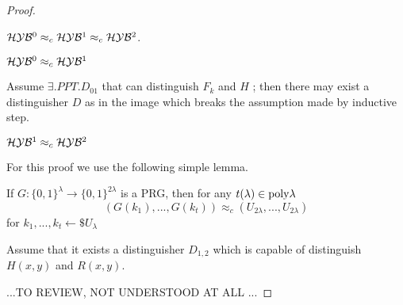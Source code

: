 \begin{proof}
    \begin{lemma}
$\mathcal{H}\mathcal{Y}\mathcal{B}^{0} \approx_{c} \mathcal{H}\mathcal{Y}\mathcal{B}^{1} \approx_{c} \mathcal{H}\mathcal{Y}\mathcal{B}^{2}$.
    \end{lemma}

    \begin{clm}
 $\mathcal{H}\mathcal{Y}\mathcal{B}^{0} \approx_{c} \mathcal{H}\mathcal{Y}\mathcal{B}^{1}$       
    \end{clm}

   Assume $ \exists .PPT. D_{01}$ that can distinguish $F_{k}$ and $H$ ; then
   there may exist a distinguisher $D$ as in the image which breaks the
   assumption made by inductive step.
\begin{figure}[h!]
   \centering
   \sdinit{}
\end{figure}

\begin{clm}
 $\mathcal{H}\mathcal{Y}\mathcal{B}^{1} \approx_{c} \mathcal{H}\mathcal{Y}\mathcal{B}^{2}$       
\end{clm}

For this proof we use the following simple lemma.
\begin{lem}
    If $ G:\{0,1\}^{\lambda} \to \{0,1\}^{2\lambda} $ is a PRG, then for any
    $t(\lambda) \in \mathrm{poly}{\lambda} $
    \[
        (G(k_{1}), ..., G(k_{t})) \approx_{c} (U_{2\lambda}, ..., U_{2\lambda})
    \]
    for $k_{1}, ..., k_{t} \leftarrow\$ U_{\lambda}$
\end{lem}

Assume that it exists a distinguisher $D_{1, 2}$ which is capable of distinguish $H(x, y)$ and $R(x, y)$.

...TO REVIEW, NOT UNDERSTOOD AT ALL ...
\end{proof}

